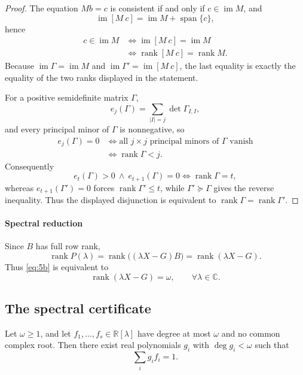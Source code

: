 \begin{proof}
	The equation $Mb=c$ is consistent if and only if
	$c\in\operatorname{im}M$, and
	\[
	\operatorname{im}[M\ c]=\operatorname{im}M+\operatorname{span}\{c\},
	\]
	hence
	\[
	\begin{aligned}
	c\in\operatorname{im}M
	&\iff \operatorname{im}[M\ c]=\operatorname{im}M\\
	&\iff \operatorname{rank}[M\ c]=\operatorname{rank}M .
	\end{aligned}
	\]
	Because $\operatorname{im}\Gamma=\operatorname{im}M$ and
	$\operatorname{im}\Gamma'=\operatorname{im}[M\ c]$, the last equality
	is exactly the equality of the two ranks displayed in the statement.

	For a positive semidefinite matrix $\Gamma$,
	\[
	e_j(\Gamma)=\sum_{|I|=j}\det\Gamma_{I,I},
	\]
	and every principal minor of $\Gamma$ is nonnegative, so
	\[
	\begin{aligned}
	e_j(\Gamma)=0
	&\iff \text{all } j\times j \text{ principal minors of } \Gamma
	\text{ vanish}\\
	&\iff \operatorname{rank}\Gamma<j .
	\end{aligned}
	\]
	Consequently
	\[
	e_t(\Gamma)>0\ \wedge\ e_{t+1}(\Gamma)=0
	\iff \operatorname{rank}\Gamma=t ,
	\]
	whereas $e_{t+1}(\Gamma')=0$ forces $\operatorname{rank}\Gamma'\le t$,
	while $\Gamma'\succeq\Gamma$ gives the reverse inequality. Thus the
	displayed disjunction is equivalent to
	$\operatorname{rank}\Gamma=\operatorname{rank}\Gamma'$.
\end{proof}

\paragraph*{Spectral reduction}\label{sec:spectral}
Since $B$ has full row rank,
\[
\operatorname{rank}P(\lambda)
=\operatorname{rank}\bigl((\lambda X-G)B\bigr)
=\operatorname{rank}(\lambda X-G).
\]
Thus \eqref{eq:5b} is equivalent to
\[
\operatorname{rank}(\lambda X-G)=\omega,\qquad\forall\lambda\in\mathbb C .
\]

\subsection{The spectral certificate}\label{sec:spectrum}

\begin{lem}\label{lem:bezout}\label{sec:bezout}
	Let $\omega\ge1$, and let $f_1,\ldots,f_s\in\mathbb R[\lambda]$ have
	degree at most $\omega$ and no common complex root. Then there exist
	real polynomials $g_i$ with $\deg g_i<\omega$ such that
	\[
	\sum_i g_i f_i=1 .
	\]
\end{lem}

